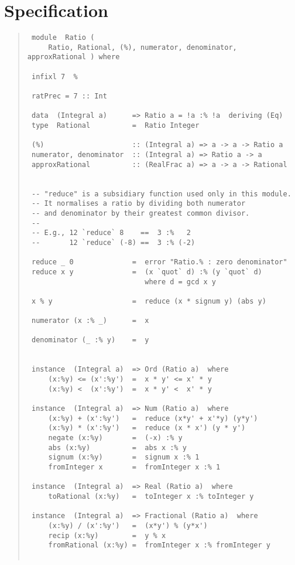 \section{Specification
}
\begin{quote}
{\haddockverb\begin{verbatim}
 module  Ratio (
     Ratio, Rational, (%), numerator, denominator, approxRational ) where
 
 infixl 7  %
 
 ratPrec = 7 :: Int
 
 data  (Integral a)      => Ratio a = !a :% !a  deriving (Eq)
 type  Rational          =  Ratio Integer
 
 (%)                     :: (Integral a) => a -> a -> Ratio a
 numerator, denominator  :: (Integral a) => Ratio a -> a
 approxRational          :: (RealFrac a) => a -> a -> Rational
 
 
 -- "reduce" is a subsidiary function used only in this module.
 -- It normalises a ratio by dividing both numerator
 -- and denominator by their greatest common divisor.
 --
 -- E.g., 12 `reduce` 8    ==  3 :%   2
 --       12 `reduce` (-8) ==  3 :% (-2)
 
 reduce _ 0              =  error "Ratio.% : zero denominator"
 reduce x y              =  (x `quot` d) :% (y `quot` d)
                            where d = gcd x y
 
 x % y                   =  reduce (x * signum y) (abs y)
 
 numerator (x :% _)      =  x
 
 denominator (_ :% y)    =  y
 
 
 instance  (Integral a)  => Ord (Ratio a)  where
     (x:%y) <= (x':%y')  =  x * y' <= x' * y
     (x:%y) <  (x':%y')  =  x * y' <  x' * y
 
 instance  (Integral a)  => Num (Ratio a)  where
     (x:%y) + (x':%y')   =  reduce (x*y' + x'*y) (y*y')
     (x:%y) * (x':%y')   =  reduce (x * x') (y * y')
     negate (x:%y)       =  (-x) :% y
     abs (x:%y)          =  abs x :% y
     signum (x:%y)       =  signum x :% 1
     fromInteger x       =  fromInteger x :% 1
 
 instance  (Integral a)  => Real (Ratio a)  where
     toRational (x:%y)   =  toInteger x :% toInteger y
 
 instance  (Integral a)  => Fractional (Ratio a)  where
     (x:%y) / (x':%y')   =  (x*y') % (y*x')
     recip (x:%y)        =  y % x
     fromRational (x:%y) =  fromInteger x :% fromInteger y
 

\end{verbatim}}
\end{quote}
